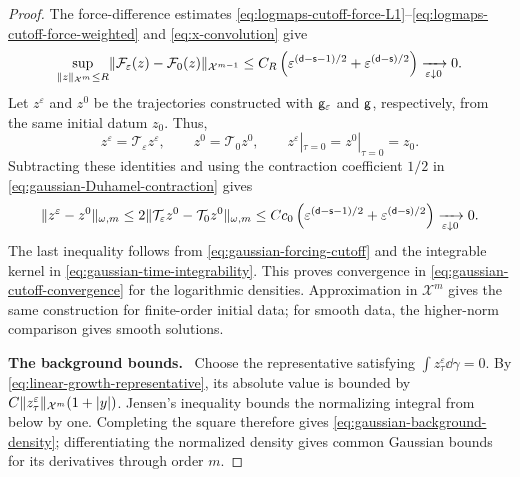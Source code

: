 \documentclass[11pt,reqno]{amsart}
\numberwithin{equation}{section}
\theoremstyle{plain}
\theoremstyle{remark}
\DeclarePairedDelimiter{\norm}{\lVert}{\rVert}
\renewcommand{\d}{\mathsf{d}}\newcommand{\s}{\mathsf{s}}
\newcommand{\parheading}[1]{\par\medskip\noindent\textbf{#1}\ }
\newcommand{\Xspace}{\mathcal X}
\begin{document}
\begin{proof}
The force-difference estimates \eqref{eq:logmaps-cutoff-force-L1}--\eqref{eq:logmaps-cutoff-force-weighted} and \eqref{eq:x-convolution} give
\begin{equation}\label{eq:gaussian-forcing-cutoff}
 \sup_{\norm z_{\Xspace^m}\le R}
 \norm{\mathcal F_\varepsilon(z)-\mathcal F_0(z)}_{\Xspace^{m-1}}
 \le C_R\left(\varepsilon^{(\d-\s-1)/2}+\varepsilon^{(\d-\s)/2}\right)
 \xrightarrow[\varepsilon\downarrow0]{}0.
\end{equation}
Let $z^\varepsilon$ and $z^0$ be the trajectories constructed with $\mathsf g_\varepsilon$ and $\mathsf g$, respectively, from the same initial datum $z_0$. Thus,
\begin{equation}\label{eq:gaussian-fixed-point-pair}
 z^\varepsilon=\mathcal T_\varepsilon z^\varepsilon,\qquad
 z^0=\mathcal T_0z^0,\qquad
 z^\varepsilon|_{\tau=0}=z^0|_{\tau=0}=z_0.
\end{equation}
Subtracting these identities and using the contraction coefficient $1/2$ in \eqref{eq:gaussian-Duhamel-contraction} gives
\begin{equation}\label{eq:gaussian-fixed-point-comparison}
 \norm{z^\varepsilon-z^0}_{\omega,m}
 \le2\norm{\mathcal T_\varepsilon z^0-\mathcal T_0z^0}_{\omega,m}
 \le Cc_0\left(\varepsilon^{(\d-\s-1)/2}+\varepsilon^{(\d-\s)/2}\right)
 \xrightarrow[\varepsilon\downarrow0]{}0.
\end{equation}
The last inequality follows from \eqref{eq:gaussian-forcing-cutoff} and the integrable kernel in \eqref{eq:gaussian-time-integrability}. This proves convergence in \eqref{eq:gaussian-cutoff-convergence} for the logarithmic densities. Approximation in $\Xspace^m$ gives the same construction for finite-order initial data; for smooth data, the higher-norm comparison gives smooth solutions.

\parheading{The background bounds.}
Choose the representative satisfying $\int z_\tau^\varepsilon\dd\gamma=0$. By \eqref{eq:linear-growth-representative}, its absolute value is bounded by $C\norm{z_\tau^\varepsilon}_{\Xspace^m}(1+|y|)$. Jensen's inequality bounds the normalizing integral from below by one. Completing the square therefore gives \eqref{eq:gaussian-background-density}; differentiating the normalized density gives common Gaussian bounds for its derivatives through order $m$.


\end{proof}
\end{document}
